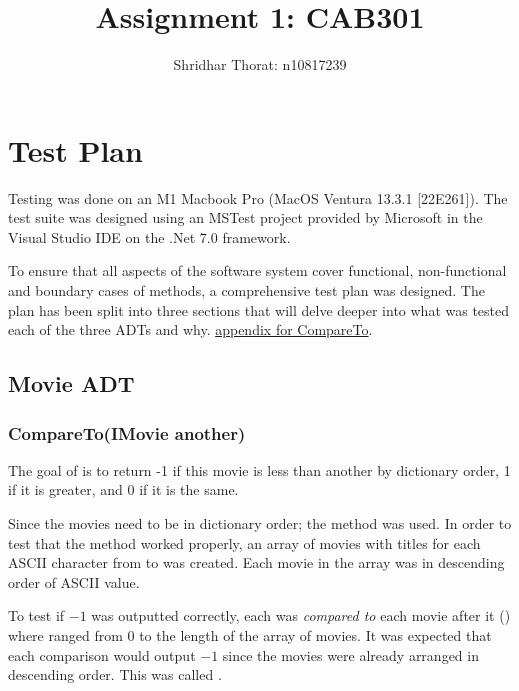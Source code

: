 \documentclass[a4paper]{article}
\begin{document}
\author{Shridhar Thorat: n10817239}
\title{Assignment 1: CAB301}
\maketitle


\section{Test Plan}
Testing was done on an M1 Macbook Pro (MacOS Ventura 13.3.1 [22E261]). The test suite was designed using an MSTest project provided by Microsoft in the Visual Studio IDE on the {.}Net 7.0 framework.
\vspace{1.5mm}

\noindent
To ensure that all aspects of the software system cover functional, non-functional and boundary cases of methods, a comprehensive test plan was designed. The plan has been split into three sections that will delve deeper into what was tested each of the three ADTs and why.
\hyperlink{subsubsection.5.2.1}{appendix for CompareTo}.
\vspace{3mm}

\subsection{Movie ADT}

\subsubsection{CompareTo{(IMovie another)}}
The goal of  is to return -1 if this movie is less than another by dictionary order, 1 if it is greater, and 0 if it is the same.
\vspace{3mm}

\noindent
Since the movies need to be in dictionary order; the  method was used. In order to test that the method worked properly, an array of movies with titles for each ASCII character from  to \codeword{~} was created. Each movie in the array was in descending order of ASCII value. 
\vspace{3mm}

\noindent
To test if $-1$ was outputted correctly, each  was \textit{compared to} each movie after it () where  ranged from $0$ to the length of the array of movies. It was expected that each comparison would output $-1$ since the movies were already arranged in descending order. This was called .
\vspace{3mm}
\end{document}
